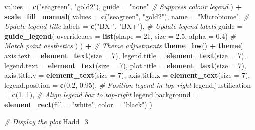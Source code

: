 \documentclass[
  11pt,
]{article}
\newenvironment{Shaded}{\begin{snugshade}}{\end{snugshade}}
\newcommand{\AttributeTok}[1]{\textcolor[rgb]{0.13,0.29,0.53}{#1}}
\newcommand{\CommentTok}[1]{\textcolor[rgb]{0.56,0.35,0.01}{\textit{#1}}}
\newcommand{\DecValTok}[1]{\textcolor[rgb]{0.00,0.00,0.81}{#1}}
\newcommand{\FloatTok}[1]{\textcolor[rgb]{0.00,0.00,0.81}{#1}}
\newcommand{\FunctionTok}[1]{\textcolor[rgb]{0.13,0.29,0.53}{\textbf{#1}}}
\newcommand{\NormalTok}[1]{#1}
\newcommand{\SpecialCharTok}[1]{\textcolor[rgb]{0.81,0.36,0.00}{\textbf{#1}}}
\newcommand{\StringTok}[1]{\textcolor[rgb]{0.31,0.60,0.02}{#1}}
\begin{document}
\begin{Shaded}
\begin{Highlighting}[]
    \AttributeTok{values =} \FunctionTok{c}\NormalTok{(}\StringTok{"seagreen"}\NormalTok{, }\StringTok{"gold2"}\NormalTok{),}
    \AttributeTok{guide =} \StringTok{"none"} \CommentTok{\# Suppress colour legend}
\NormalTok{  ) }\SpecialCharTok{+}
  \FunctionTok{scale\_fill\_manual}\NormalTok{(}
    \AttributeTok{values =} \FunctionTok{c}\NormalTok{(}\StringTok{"seagreen"}\NormalTok{, }\StringTok{"gold2"}\NormalTok{),}
    \AttributeTok{name =} \StringTok{"Microbiome"}\NormalTok{,  }\CommentTok{\# Update legend title}
    \AttributeTok{labels =} \FunctionTok{c}\NormalTok{(}\StringTok{"BX{-}"}\NormalTok{, }\StringTok{"BX+"}\NormalTok{),  }\CommentTok{\# Update legend labels}
    \AttributeTok{guide =} \FunctionTok{guide\_legend}\NormalTok{(}
      \AttributeTok{override.aes =} \FunctionTok{list}\NormalTok{(}\AttributeTok{shape =} \DecValTok{21}\NormalTok{, }\AttributeTok{size =} \FloatTok{2.5}\NormalTok{, }\AttributeTok{alpha =} \FloatTok{0.4}\NormalTok{) }\CommentTok{\# Match point aesthetics}
\NormalTok{    )}
\NormalTok{  ) }\SpecialCharTok{+}
  \CommentTok{\# Theme adjustments}
  \FunctionTok{theme\_bw}\NormalTok{() }\SpecialCharTok{+}
  \FunctionTok{theme}\NormalTok{(}
    \AttributeTok{axis.text =} \FunctionTok{element\_text}\NormalTok{(}\AttributeTok{size =} \DecValTok{7}\NormalTok{),}
    \AttributeTok{legend.title =} \FunctionTok{element\_text}\NormalTok{(}\AttributeTok{size =} \DecValTok{7}\NormalTok{),}
    \AttributeTok{legend.text =} \FunctionTok{element\_text}\NormalTok{(}\AttributeTok{size =} \DecValTok{7}\NormalTok{),}
    \AttributeTok{plot.title =} \FunctionTok{element\_text}\NormalTok{(}\AttributeTok{size =} \DecValTok{7}\NormalTok{),}
    \AttributeTok{axis.title.y =} \FunctionTok{element\_text}\NormalTok{(}\AttributeTok{size =} \DecValTok{7}\NormalTok{),}
    \AttributeTok{axis.title.x =} \FunctionTok{element\_text}\NormalTok{(}\AttributeTok{size =} \DecValTok{7}\NormalTok{),}
    \AttributeTok{legend.position =} \FunctionTok{c}\NormalTok{(}\FloatTok{0.2}\NormalTok{, }\FloatTok{0.95}\NormalTok{),  }\CommentTok{\# Position legend in top{-}right}
    \AttributeTok{legend.justification =} \FunctionTok{c}\NormalTok{(}\DecValTok{1}\NormalTok{, }\DecValTok{1}\NormalTok{),   }\CommentTok{\# Align legend box to top{-}right}
    \AttributeTok{legend.background =} \FunctionTok{element\_rect}\NormalTok{(}\AttributeTok{fill =} \StringTok{"white"}\NormalTok{, }\AttributeTok{color =} \StringTok{"black"}\NormalTok{)}
\NormalTok{  )}

\CommentTok{\# Display the plot}
\NormalTok{Hadd\_3}
\end{Highlighting}
\end{Shaded}
\end{document}
